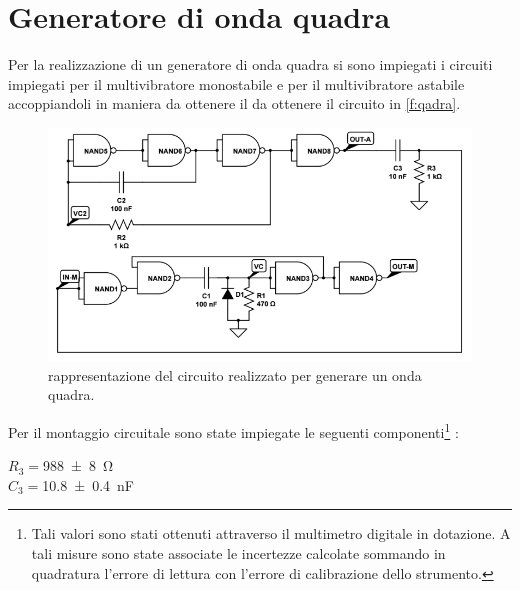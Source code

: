 \section{Generatore di onda quadra}
	Per la realizzazione di un generatore di onda quadra
	si sono impiegati i circuiti impiegati per il multivibratore monostabile e
	per il multivibratore astabile 
	accoppiandoli in maniera da ottenere il da ottenere il circuito in \figurename{ \ref{f:qadra}}.
	\begin{figure}[htb]
		\includegraphics[scale=1.0]{../Figs-Tabs/qadra.png}
		\caption{rappresentazione del circuito realizzato per generare un onda quadra.}
	\end{figure}\label{f:qadra}

	Per il montaggio circuitale sono state impiegate le seguenti componenti\footnote{Tali valori sono stati ottenuti attraverso il multimetro digitale in dotazione. A tali misure sono state associate le incertezze calcolate sommando in quadratura l'errore di lettura con l'errore di calibrazione dello strumento.} :\\
	\begin{center}
		$R_{3}=$\SI{988 \pm 8}{\ohm}\\
		$C_{3}=$\SI{10.8 \pm 0.4 }{\nano \farad}\\
	\end{center}
	
